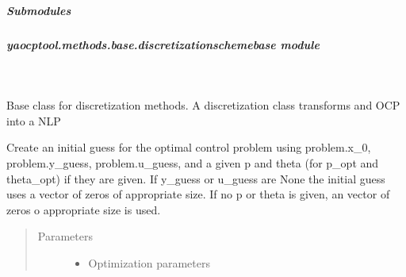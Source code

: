 \documentclass[letterpaper,10pt,english]{sphinxmanual}
\begin{document}
\subparagraph{Submodules}
\label{\detokenize{yaocptool.methods.base:submodules}}

\subparagraph{yaocptool.methods.base.discretizationschemebase module}
\label{\detokenize{yaocptool.methods.base:module-yaocptool.methods.base.discretizationschemebase}}\label{\detokenize{yaocptool.methods.base:yaocptool-methods-base-discretizationschemebase-module}}

\begin{fulllineitems}
\label{\detokenize{yaocptool.methods.base:yaocptool.methods.base.discretizationschemebase.DiscretizationSchemeBase}}~

\begin{fulllineitems}
\label{\detokenize{yaocptool.methods.base:yaocptool.methods.base.discretizationschemebase.DiscretizationSchemeBase.__init__}}
Base class for discretization methods. A discretization class transforms and OCP into a NLP
\begin{quote}\begin{description}
\end{description}\end{quote}

\end{fulllineitems}


\begin{fulllineitems}
\label{\detokenize{yaocptool.methods.base:yaocptool.methods.base.discretizationschemebase.DiscretizationSchemeBase.create_initial_guess}}
Create an initial guess for the optimal control problem using problem.x\_0, problem.y\_guess, problem.u\_guess,
and a given p and theta (for p\_opt and theta\_opt) if they are given.
If y\_guess or u\_guess are None the initial guess uses a vector of zeros of appropriate size.
If no p or theta is given, an vector of zeros o appropriate size is used.
\begin{quote}\begin{description}
\item[{Parameters}] \leavevmode\begin{itemize}
\item {} 
 \textendash{} Optimization parameters


\end{itemize}
\end{description}
\end{quote}
\end{fulllineitems}
\end{fulllineitems}
\end{document}
